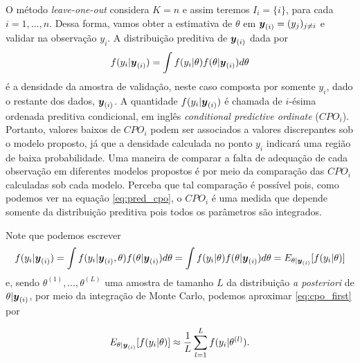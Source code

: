O método \textit{leave-one-out} considera $K=n$ e assim teremos $I_i=\{i\}$, para cada $i=1,\ldots,n$. Dessa forma, vamos obter a estimativa de $\theta$ em ${\boldsymbol{y}_{(i)}} = (y_j)_{j\neq i}$ e validar na observação $y_i$. A distribuição preditiva de ${\boldsymbol{y}_{(i)}}$ dada por
\begin{equation}\label{eq:pred_cpo}
f(y_i|{\boldsymbol{y}_{(i)}}) = \int  f(y_i|\theta)f(\theta|{\boldsymbol{y}_{(i)}}) d\theta
\end{equation}
é a densidade da amostra de validação, neste caso composta por somente $y_i$, dado o restante dos dados, ${\boldsymbol{y}_{(i)}}$. A quantidade $f(y_i|{\boldsymbol{y}_{(i)}})$ é chamada de $i$-ésima ordenada preditiva condicional, em inglês \textit{conditional predictive ordinate} ($CPO_i$). Portanto, valores baixos de $CPO_i$ podem ser associados a valores discrepantes sob o modelo proposto, já que a densidade calculada no ponto $y_i$ indicará uma região de baixa probabilidade. Uma maneira de comparar a falta de adequação de cada observação em diferentes modelos propostos é por meio da comparação das $CPO_i$ calculadas sob cada modelo. Perceba que tal comparação é possível pois, como podemos ver na equação \eqref{eq:pred_cpo}, o $CPO_i$ é uma medida que depende somente da distribuição preditiva pois todos os parâmetros são integrados.

Note que podemos escrever
\begin{equation}\label{eq:cpo_first}
f(y_i|{\boldsymbol{y}_{(i)}}) = \int f(y_i|{\boldsymbol{y}_{(i)}},\theta)f(\theta|{\boldsymbol{y}_{(i)}}) d\theta = \int f(y_i|\theta)f(\theta|{\boldsymbol{y}_{(i)}}) d\theta = E_{\theta|{\boldsymbol{y}_{(i)}}}[f(y_i|\theta)]
\end{equation}
e, sendo $\theta^{(1)},\ldots,\theta^{(L)}$ uma amostra de tamanho $L$ da distribuição \textit{a posteriori} de $\theta|{\boldsymbol{y}_{(i)}}$, por meio da integração de Monte Carlo, podemos aproximar \eqref{eq:cpo_first} por

\begin{equation}\label{eq:cpo_approx}
 E_{\theta|{\boldsymbol{y}_{(i)}}}[f(y_i|\theta)]\approx \frac{1}{L}\sum_{l=1}^L f(y_i|\theta^{(l)}).
\end{equation}

